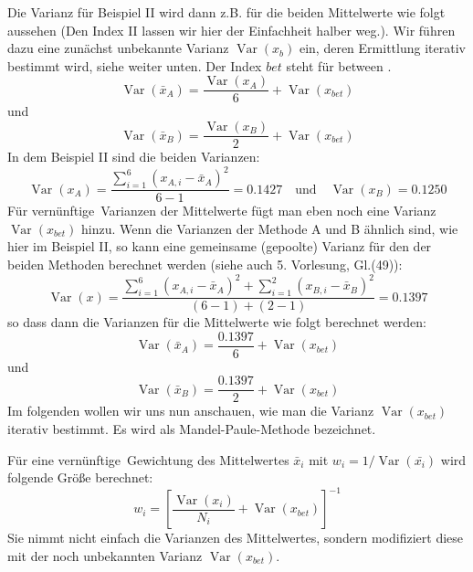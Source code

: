Die Varianz für Beispiel II wird dann z.B. für die beiden Mittelwerte 
wie folgt aussehen (Den Index \glqq II \grqq lassen wir hier der 
Einfachheit halber weg.). Wir führen dazu eine zunächst unbekannte Varianz $\operatorname{Var}(x_b)$ ein, deren Ermittlung iterativ bestimmt wird, siehe weiter unten. Der Index \glqq $bet$ \grqq steht für \glqq between \grqq.
\begin{equation}
\operatorname{Var}(\bar x_A) = \frac{\operatorname{Var}(x_A)}{6} +  
\operatorname{Var}(x_{bet})
\end{equation}
und 
\begin{equation}
\operatorname{Var}(\bar x_B) = \frac{\operatorname{Var}(x_B)}{2} +  
\operatorname{Var}(x_{bet})
\end{equation}
In dem Beispiel II sind die beiden Varianzen:
\begin{equation}
 \operatorname{Var}(x_A)=\frac{\sum\limits_{i=1}^6 (x_{A,i} - \bar{x}_A)^2}{6-1} = 0.1427 \quad \text{und} \quad 
 \operatorname{Var}(x_B)=0.1250
\end{equation}
Für \glqq vernünftige\grqq~Varianzen der Mittelwerte fügt man eben noch 
eine Varianz $\operatorname{Var}(x_{bet})$ hinzu. Wenn die Varianzen 
der Methode A und B ähnlich sind, wie hier im Beispiel II, so kann eine
gemeinsame (gepoolte) Varianz für den der beiden Methoden 
berechnet werden (siehe auch 5. Vorlesung, Gl.(49)):
\begin{equation}
 \operatorname{Var}(x) = \frac{\sum\limits_{i=1}^6 \left(x_{A,i}-\bar x_A\right )^2+\sum\limits_{i=1}^2 \left(x_{B,i}-\bar x_B\right )^2}{(6-1)+(2-1)} = 0.1397
\end{equation} 
so dass dann die Varianzen für die Mittelwerte wie folgt berechnet werden:
\begin{equation}
\operatorname{Var}(\bar x_A) = \frac{0.1397}{6} +  
\operatorname{Var}(x_{bet})
\end{equation}
und 
\begin{equation}
\operatorname{Var}(\bar x_B) = \frac{0.1397}{2} +  
\operatorname{Var}(x_{bet})
\end{equation}
Im folgenden wollen wir uns nun anschauen, wie man die Varianz 
$\operatorname{Var}(x_{bet})$ iterativ bestimmt. Es wird als Mandel-Paule-Methode
bezeichnet.

Für eine \glqq vernünftige\grqq~Gewichtung des Mittelwertes $\bar x_i$ mit 
$w_i = 1/\operatorname{Var}(\bar{x_i})$ wird folgende Größe berechnet: 
\begin{equation}
w_i = \left[ \frac{\operatorname{Var}(x_{i})}{N_i} + 
\operatorname{Var}(x_{bet}) \right]^{-1} 
\label{eq:Gewichte_bestimmen}
\end{equation}
Sie nimmt nicht einfach die Varianzen des Mittelwertes, sondern 
modifiziert diese mit der noch unbekannten Varianz $\operatorname{Var}(x_{bet})$.

